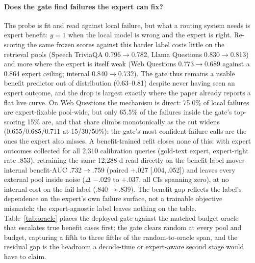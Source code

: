 \paragraph{Does the gate find failures the expert can fix?}
The probe is fit and read against local failure, but what a
routing system needs is expert benefit: $y{=}1$ when the local
model is wrong and the expert is right. Re-scoring the same
frozen scores against this harder label costs little on the retrieval
pools (Speech TriviaQA 0.796$\to$0.782, Llama Questions 0.830$\to$0.813)
and more where the expert is itself weak (Web Questions
0.773$\to$0.689 against a 0.864 expert ceiling; internal 0.840$\to$0.732).
The gate thus remains a usable benefit predictor out of distribution
(0.63--0.81) despite never having seen an expert outcome, and the drop
is largest exactly where the paper already reports a flat live curve.
On Web Questions the mechanism is direct: 75.0\% of local failures are
expert-fixable pool-wide, but only 65.5\% of the failures inside the
gate's top-scoring 15\% are, and that share climbs monotonically as
the cut widens (0.655/0.685/0.711 at 15/30/50\%): the gate's most
confident failure calls are the ones the expert also misses.
A benefit-trained refit closes none of this: with expert
outcomes collected for all 2{,}310 calibration queries (gold-text
expert, expert-right rate .853), retraining the same 12{,}288-d read
directly on the benefit label moves internal benefit-AUC
.732$\to$.759 (paired $+$.027 [.004,\,.052]) and leaves every
external pool inside noise ($\Delta$ $-$.029 to $+$.037, all CIs
spanning zero), at no internal cost on the fail label
(.840$\to$.839). The benefit gap reflects the label's dependence on
the expert's own failure surface, not a trainable objective
mismatch: the expert-agnostic label leaves nothing on the table.
Table~\ref{tab:oracle} places the
deployed gate against the matched-budget oracle that escalates true
benefit cases first: the gate clears random at every pool and budget,
capturing a fifth to three fifths of the random-to-oracle span, and
the residual gap is the headroom a decode-time or expert-aware second
stage would have to claim.

